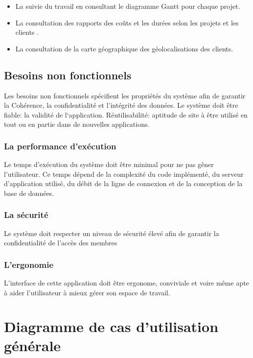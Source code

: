 \begin{itemize}
\item{ La suivie du travail en consultant le diagramme Gantt pour chaque projet.}
\item{La consultation des rapports des co\^{u}ts et les dur\'{e}es selon les projets et les clients   .}
\item{La consultation de la carte g\'{e}ographique des g\'{e}olocalisations des  clients.}
\end{itemize}

  \subsection{Besoins non fonctionnels}
Les besoins non fonctionnels sp\'{e}cifient les propri\'{e}t\'{e}s du syst\`{e}me afin de
garantir la Coh\'{e}rence, la confidentialit\'{e} et l'int\'{e}grit\'{e} des donn\'{e}es.
Le syst\`{e}me doit \^{e}tre fiable: la validit\'{e} de l`application.
R\'{e}utilisabilit\'{e}: aptitude de site \`{a} \^{e}tre utilis\'{e} en tout ou en partie dans de
nouvelles applications.

\subsubsection{La performance d'ex\'{e}cution}

Le temps d'ex\'{e}cution du syst\`{e}me doit \^{e}tre minimal pour ne pas g\^{e}ner
l'utilisateur. Ce temps d\'{e}pend de la complexit\'{e} du code impl\'{e}ment\'{e}, du
serveur d'application utilis\'{e}, du d\'{e}bit de la ligne de connexion et de la
conception de la base de donn\'{e}es.

\subsubsection{La s\'{e}curit\'{e}}

Le syst\`{e}me doit respecter un niveau de s\'{e}curit\'{e} \'{e}lev\'{e} afin de garantir la
confidentialit\'{e} de l'acc\`{e}s des membres

\subsubsection{L'ergonomie }

L'interface de cette application doit \^{e}tre ergonome, conviviale et voire m\^{e}me
apte \`{a} aider l'utilisateur \`{a} mieux g\'{e}rer son espace de travail.


\section{ Diagramme de cas d'utilisation g\'{e}n\'{e}rale }





